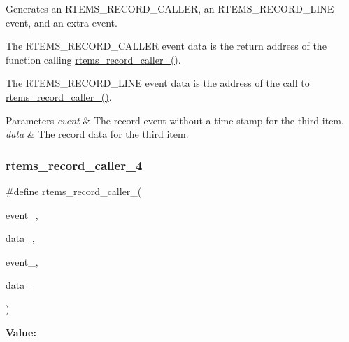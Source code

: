 Generates an R\+T\+E\+M\+S\+\_\+\+R\+E\+C\+O\+R\+D\+\_\+\+C\+A\+L\+L\+ER, an R\+T\+E\+M\+S\+\_\+\+R\+E\+C\+O\+R\+D\+\_\+\+L\+I\+NE event, and an extra event. 

The R\+T\+E\+M\+S\+\_\+\+R\+E\+C\+O\+R\+D\+\_\+\+C\+A\+L\+L\+ER event data is the return address of the function calling \mbox{\hyperlink{group__RTEMSRecord_gae9a52731b848ed38623ed5b658d14086}{rtems\+\_\+record\+\_\+caller\+\_()}}.

The R\+T\+E\+M\+S\+\_\+\+R\+E\+C\+O\+R\+D\+\_\+\+L\+I\+NE event data is the address of the call to \mbox{\hyperlink{group__RTEMSRecord_gae9a52731b848ed38623ed5b658d14086}{rtems\+\_\+record\+\_\+caller\+\_()}}.


\begin{DoxyParams}{Parameters}
{\em event} & The record event without a time stamp for the third item. \\
\hline
{\em data} & The record data for the third item. \\
\hline
\end{DoxyParams}
\mbox{\label{group__RTEMSRecord_gaccb677a7151eaa44056ea1a4ce41503c}} 
\subsubsection{\texorpdfstring{rtems\_record\_caller\_4}{rtems\_record\_caller\_4}}
{\footnotesize\ttfamily \#define rtems\+\_\+record\+\_\+caller\+\_(\begin{DoxyParamCaption}\item[{}]{event\+\_,  }\item[{}]{data\+\_,  }\item[{}]{event\+\_,  }\item[{}]{data\+\_ }\end{DoxyParamCaption})}

{\bfseries Value\+:}
\begin{DoxyCode}{0}
\DoxyCodeLine{  )}

\end{DoxyCode}


